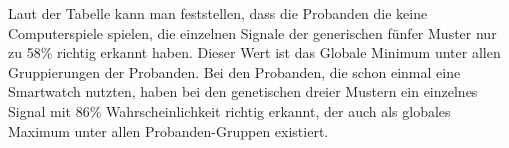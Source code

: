 Laut der Tabelle kann man feststellen, dass die Probanden die keine Computerspiele spielen, die einzelnen Signale der generischen f{\"u}nfer Muster nur zu 58\% richtig erkannt haben. Dieser Wert ist das Globale Minimum unter allen Gruppierungen der Probanden.
Bei den Probanden, die schon einmal eine Smartwatch nutzten, haben bei den genetischen dreier Mustern ein einzelnes Signal mit 86\% Wahrscheinlichkeit richtig erkannt, der auch als globales Maximum unter allen Probanden-Gruppen existiert.


